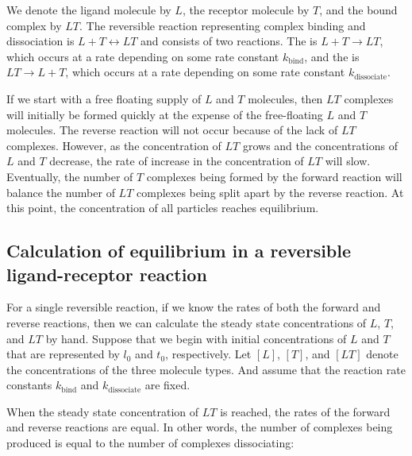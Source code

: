 \begin{note}\end{note}

We denote the ligand molecule by $L$, the receptor molecule by $T$, and the bound complex by $LT$. The reversible reaction representing complex binding and dissociation is $L + T \longleftrightarrow LT$ and consists of two reactions. The  is $L + T \rightarrow LT$, which occurs at a rate depending on some rate constant $k_\text{bind}$, and the  is $LT \rightarrow L + T$, which occurs at a rate depending on some rate constant $k_\text{dissociate}$.

If we start with a free floating supply of $L$ and $T$ molecules, then $LT$ complexes will initially be formed quickly at the expense of the free-floating $L$ and $T$ molecules. The reverse reaction will not occur because of the lack of $LT$ complexes. However, as the concentration of $LT$ grows and the concentrations of $L$ and $T$ decrease, the rate of increase in the concentration of $LT$ will slow. Eventually, the number of $T$ complexes being formed by the forward reaction will balance the number of $LT$ complexes being split apart by the reverse reaction. At this point, the concentration of all particles reaches equilibrium.

\FloatBarrier
{}
\subsection{Calculation of equilibrium in a reversible ligand-receptor reaction}

For a single reversible reaction, if we know the rates of both the forward and reverse reactions, then we can calculate the steady state concentrations of $L$, $T$, and $LT$ by hand.  Suppose that we begin with initial concentrations of $L$ and $T$ that are represented by $l_0$ and $t_0$, respectively. Let $[L]$, $[T]$, and $[LT]$ denote the concentrations of the three molecule types. And assume that the reaction rate constants $k_\text{bind}$ and $k_\text{dissociate}$ are fixed.

When the steady state concentration of $LT$ is reached, the rates of the forward and reverse reactions are equal. In other words, the number of complexes being produced is equal to the number of complexes dissociating:

